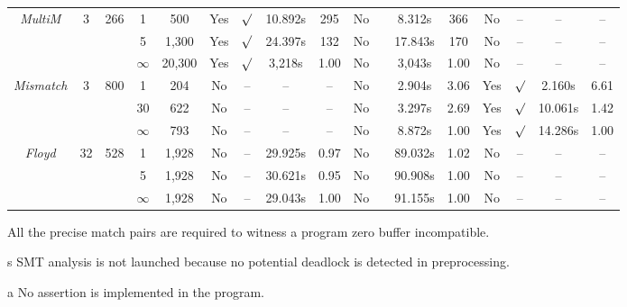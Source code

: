 \begin{savenotes}
\begin{table*}[t]
\begin{center}
\begin{threeparttable}
\begin{tabular}{|c|c|c|c|c|c|c|c|c|c|c|c|c|c|c|c|c|}
	 \multirow{3}{*}{\textit{MultiM}} & \multirow{3}{*}{3}& \multirow{3}{*}{266} & 1 & 500 & Yes  &$\surd$&10.892s& 295 & No & & 8.312s&366 & No&-- &--\tnote{s} &-- \\ \cline{4-17}
								&				&                   & 5& 1,300 & Yes& $\surd$& 24.397s & 132 & No & &17.843s & 170&No&--&--\tnote{s}&--\\ \cline{4-17}
								&				&                   & $\infty$ & 20,300 & Yes & $\surd$ & 3,218s & 1.00& No& &  3,043s& 1.00&No&--&--\tnote{s}&--\\ \hline
								\hline
								
	 \multirow{3}{*}{\textit{Mismatch}} & \multirow{3}{*}{3}& \multirow{3}{*}{800} & 1 & 204 & No &-- &--\tnote{a} & --&No & & 2.904s & 3.06&Yes&$\surd$&2.160s& 6.61\\ \cline{4-17}
								&				& 			 & 30 & 622 & No&-- &--\tnote{a} &-- & No& & 3.297s& 2.69 &Yes&$\surd$&10.061s&1.42\\ \cline{4-17}
								&				& 			 & $\infty$& 793 &No &-- &--\tnote{a} &-- & No& & 8.872s &1.00 &Yes&$\surd$&14.286s&1.00\\ \hline
								\hline
			
	 \multirow{3}{*}{\textit{Floyd}} & \multirow{3}{*}{32}& \multirow{3}{*}{528} &1& 1,928 & No&-- &29.925s & 0.97 & No &  & 89.032s & 1.02 & No&--&--\tnote{s}&--\\ \cline{4-17}
								&				& 		     & 5&1,928 & No &-- &30.621s & 0.95 & No &  & 90.908s& 1.00&No&--&--\tnote{s}&--\\ \cline{4-17}
								&				& 		     & $\infty$&1,928 &No &-- &29.043s &1.00 & No&  &91.155s &1.00 &No&--&--\tnote{s}&--\\ \hline
           
        
         
\end{tabular}
\begin{tablenotes}
\item[\textdagger] All the precise match pairs are required to witness a program zero buffer incompatible.
\item[s] SMT analysis is not launched because no potential deadlock is detected in preprocessing.
\item[a] No assertion is implemented in the program.
\end{tablenotes}
     \end{threeparttable}
\end{center}
\end{table*}
\end{savenotes}

